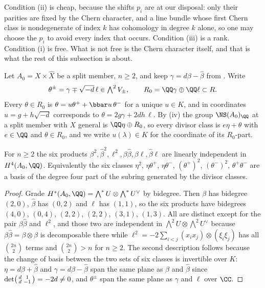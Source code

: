 Condition (ii) is cheap, because the shifts $p_{i}$ are at our disposal: only
their parities are fixed by the Chern character, and a line bundle whose first
Chern class is nondegenerate of index $k$ has cohomology in degree $k$ alone,
so one may choose the $p_{i}$ to avoid every index that occurs. Condition
(iii) is a rank. Condition (i) is free. What is not free is the Chern
character itself, and that is what the rest of this subsection is about.

\begin{notation}\label{not:splitcoords}
Let $A_{0}=X\times\widehat{X}$ be a split member, $n\ge2$, and keep
$\gamma=d\beta-\widehat{\beta}$ from . Write
\[
  \theta^{\pm}=\gamma\mp\sqrt{-d}\,\ell\in\textstyle\bigwedge^{2}V_{\pm},
  \qquad
  R_{0}=\QQ\gamma\oplus\QQ\ell\subset R .
\]
Every $\theta\in R_{0}$ is $\theta=u\theta^{+}+\bbar u\,\theta^{-}$ for a
unique $u\in K$, and in coordinates $u=g+h\sqrt{-d}$ corresponds to
$\theta=2g\gamma+2dh\,\ell$. By (iv) the group
$\NS(A_{0})_{\QQ}$ at a split member with $X$ general is
$\QQ\eta\oplus R_{0}$, so every divisor class is $e\eta+\theta$ with
$e\in\QQ$ and $\theta\in R_{0}$, and we write $u(\lambda)\in K$ for the
coordinate of its $R_{0}$-part.
\end{notation}

\begin{lemma}\label{lem:sixmonomials}
For $n\ge2$ the six products
$\beta^{2},\widehat\beta^{2},\ell^{2},\beta\widehat\beta,\beta\ell,
\widehat\beta\ell$
are linearly independent in $H^{4}(A_{0},\QQ)$. Equivalently the six classes
$\eta^{2}$, $\eta\theta^{+}$, $\eta\theta^{-}$, $(\theta^{+})^{2}$,
$(\theta^{-})^{2}$, $\theta^{+}\theta^{-}$ are a basis of the degree four part
of the subring generated by the divisor classes.
\end{lemma}

\begin{proof}
Grade $H^{*}(A_{0},\QQ)=\bigwedge^{*}U\otimes\bigwedge^{*}U^{\vee}$ by
bidegree. Then $\beta$ has bidegree $(2,0)$, $\widehat\beta$ has $(0,2)$ and
$\ell$ has $(1,1)$, so the six products have bidegrees $(4,0)$, $(0,4)$,
$(2,2)$, $(2,2)$, $(3,1)$, $(1,3)$. All are distinct except for the pair
$\beta\widehat\beta$ and $\ell^{2}$, and those two are independent in
$\bigwedge^{2}U\otimes\bigwedge^{2}U^{\vee}$ because
$\beta\widehat\beta=\beta\otimes\widehat\beta$ is decomposable there while
$\ell^{2}=-2\sum_{i<j}(x_{i}x_{j})\otimes(\xi_{i}\xi_{j})$ has all
$\binom{2n}{2}$ terms and $\binom{2n}{2}>n$ for $n\ge2$. The second
description follows because the change of basis between the two sets of six
classes is invertible over $K$: $\eta=d\beta+\widehat\beta$ and
$\gamma=d\beta-\widehat\beta$ span the same plane as
$\beta$ and $\widehat\beta$ since $\det\begin{psmallmatrix}d&1\\
d&-1\end{psmallmatrix}=-2d\ne0$, and $\theta^{\pm}$ span the same plane
as $\gamma$ and $\ell$ over $\CC$.
\end{proof}


